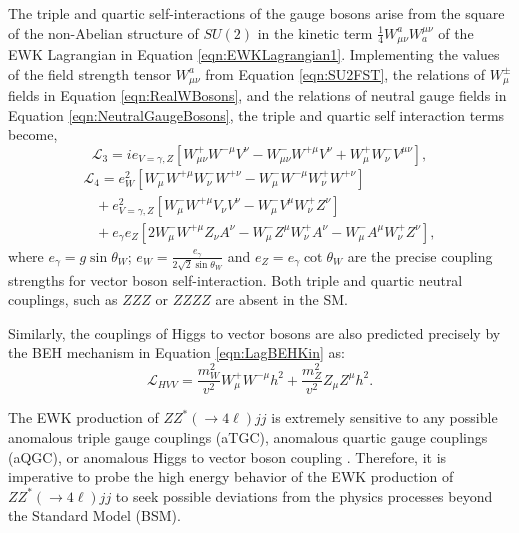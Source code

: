 The triple and quartic self-interactions of the gauge bosons arise from the square of the non-Abelian structure of $SU(2)$ in the kinetic term $ \frac{1}{4} W^{a}_{\mu\nu} W^{\mu\nu}_{a}$ of the EWK Lagrangian in Equation \ref{eqn:EWKLagrangian1}. Implementing the values of the field strength tensor $W^{a}_{\mu\nu}$ from Equation \ref{eqn:SU2FST}, the relations of $W_{\mu}^{\pm}$ fields in Equation \ref{eqn:RealWBosons}, and the relations of neutral gauge fields in Equation \ref{eqn:NeutralGaugeBosons}, the triple and quartic self interaction terms become, 
\begin{equation}
\mathcal{L}_{3} = ie_{V=\gamma,Z} [ W^{+}_{\mu\nu} W^{-\mu} V^{\nu} - W^{-}_{\mu\nu} W^{+\mu} V^{\nu} + W_{\mu}^{+}W_{\nu}^{-}V^{\mu\nu} ], 
\label{eqn:L_TGC}
\end{equation}
\begin{equation}
\begin{array}{l}
\mathcal{L}_{4} = e^{2}_{W} [ W^{-}_{\mu}W^{+\mu}W^{-}_{\nu}W^{+\nu} - W^{-}_{\mu}W^{-\mu}W^{+}_{\nu}W^{+\nu} ] \\
 \hspace{10pt} + e^2_{V=\gamma,Z} [ W^{-}_{\mu}W^{+\mu}V_{\nu}V^{\nu} - W^{-}_{\mu}V^{\mu}W^{+}_{\nu}Z^{\nu} ] \\
  \hspace{10pt} + e_{\gamma}e_{Z} [ 2W^{-}_{\mu} W^{+\mu} Z_{\nu}A^{\nu} - W_{\mu}^{-}Z^{\mu}W^{+}_{\nu}A^{\nu} - W_{\mu}^{-}A^{\mu}W^{+}_{\nu}Z^{\nu} ],
\end{array}
\label{eqn:L_QGC}
\end{equation}
where $e_{\gamma} = g\sin\theta_{W}$; $e_{W} = \frac{e_{\gamma}}{2\sqrt{2}\sin\theta_{W}}$ and $e_{Z} = e_{\gamma}\cot\theta_{W}$ are the precise coupling strengths for vector boson self-interaction. Both triple and quartic neutral couplings, such as $ZZZ$ or $ZZZZ$ are absent in the SM. 

Similarly, the couplings of Higgs to vector bosons are also predicted precisely by the BEH mechanism in Equation \ref{eqn:LagBEHKin} as:
\begin{equation}
\mathcal{L}_{HVV} = \frac{m_{W}^2}{v^2} W^{+}_{\mu}W^{-\mu}h^{2} + \frac{m_{Z}^{2}}{v^2} Z_{\mu}Z^{\mu}h^{2}.
\label{eqn:HVVCoupling}
\end{equation}

The EWK production of $ZZ^*(\rightarrow 4\ell ) jj$ is extremely sensitive to any possible anomalous triple gauge couplings (aTGC), anomalous quartic gauge couplings (aQGC), or anomalous Higgs to vector boson coupling \cite{SensitivityNP} \cite{EFT_Eboli} \cite{BSM_Simple2HDM}. Therefore, it is imperative to probe the high energy behavior of the EWK production of $ZZ^*(\rightarrow 4\ell ) jj$ to seek possible deviations from the physics processes beyond the Standard Model (BSM). 

